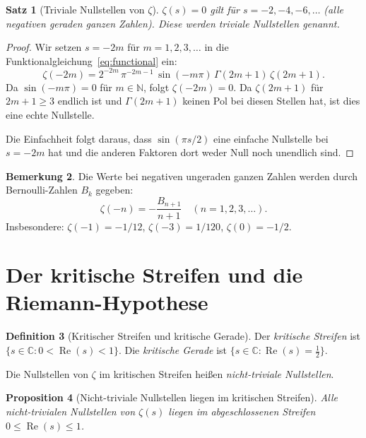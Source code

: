 \documentclass[12pt,a4paper]{amsart}
\newtheorem{theorem}{Satz}[section]
\newtheorem{proposition}[theorem]{Proposition}
\theoremstyle{definition}
\newtheorem{definition}[theorem]{Definition}
\newtheorem{remark}[theorem]{Bemerkung}
\newcommand{\N}{\mathbb{N}}
\newcommand{\C}{\mathbb{C}}
\DeclareMathOperator{\Re}{Re}
\begin{document}
\begin{theorem}[Triviale Nullstellen von $\zeta$]
\label{thm:trivial_zeros}
$\zeta(s) = 0$ gilt f\"ur $s = -2, -4, -6, \ldots$
(alle negativen geraden ganzen Zahlen).
Diese werden \emph{triviale Nullstellen} genannt.
\end{theorem}

\begin{proof}
Wir setzen $s = -2m$ f\"ur $m = 1, 2, 3, \ldots$ in die
Funktionalgleichung~\eqref{eq:functional} ein:
\[
  \zeta(-2m) = 2^{-2m}\,\pi^{-2m-1}\,\sin(-m\pi)\,\Gamma(2m+1)\,\zeta(2m+1).
\]
Da $\sin(-m\pi) = 0$ f\"ur $m \in \N$, folgt $\zeta(-2m) = 0$.
Da $\zeta(2m+1)$ f\"ur $2m+1 \ge 3$ endlich ist und $\Gamma(2m+1)$ keinen
Pol bei diesen Stellen hat, ist dies eine echte Nullstelle.

Die Einfachheit folgt daraus, dass $\sin(\pi s/2)$ eine einfache Nullstelle
bei $s = -2m$ hat und die anderen Faktoren dort weder Null noch unendlich sind.
\end{proof}

\begin{remark}
Die Werte bei negativen ungeraden ganzen Zahlen werden durch
Bernoulli-Zahlen $B_k$ gegeben:
\[
  \zeta(-n) = -\frac{B_{n+1}}{n+1} \quad (n = 1, 2, 3, \ldots).
\]
Insbesondere: $\zeta(-1) = -1/12$, $\zeta(-3) = 1/120$, $\zeta(0) = -1/2$.
\end{remark}

\section{Der kritische Streifen und die Riemann-Hypothese}

\begin{definition}[Kritischer Streifen und kritische Gerade]
\label{def:critical_strip}
Der \emph{kritische Streifen} ist $\{s \in \C : 0 < \Re(s) < 1\}$.
Die \emph{kritische Gerade} ist $\{s \in \C : \Re(s) = \tfrac{1}{2}\}$.

Die Nullstellen von $\zeta$ im kritischen Streifen hei\ss en
\emph{nicht-triviale Nullstellen}.
\end{definition}

\begin{proposition}[Nicht-triviale Nullstellen liegen im kritischen Streifen]
\label{prop:zeros_in_strip}
Alle nicht-trivialen Nullstellen von $\zeta(s)$ liegen im abgeschlossenen
Streifen $0 \le \Re(s) \le 1$.
\end{proposition}
\end{document}
